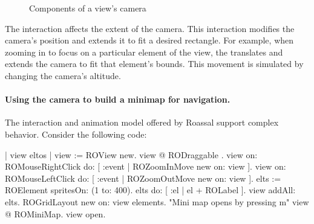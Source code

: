 \documentclass[a4paper,10pt,twoside]{book}
\begin{document}
\begin{figure}[H]
\centering
{} \hfill
{}\hfill
\caption{Components of a view's camera}\label{fig:cameraDiagram}
\end{figure}

The  interaction affects the extent of the camera. This interaction modifies the camera's position and extends it to fit a desired rectangle. For example, when zooming in to focus on a particular element of the view, the   translates and extends the camera to fit that element's bounds.
This movement is simulated by changing the camera's altitude.

\paragraph{Using the camera to build a minimap for navigation.}
The interaction and animation model offered by Roassal support complex behavior. Consider the following code:

\begin{code}{}
| view eltos |
view := ROView new.
view @ RODraggable .
view on: ROMouseRightClick do: [ :event | 
		ROZoomInMove new on: view ].
view on: ROMouseLeftClick do: [ :event | 
		ROZoomOutMove new on: view ].
elts := ROElement spritesOn: (1 to: 400).
elts do:  [ :el | el + ROLabel  ].
view addAll: elts.
ROGridLayout new on: view elements.
	"Mini map opens by pressing m"
view @ ROMiniMap.
view open.
\end{code}
\end{document}
